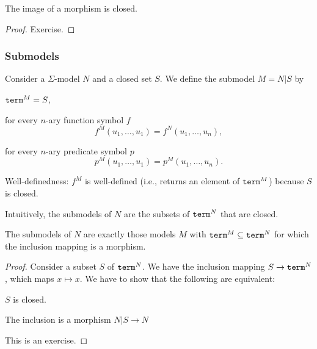 \begin{theorem}
The image of a morphism is closed.
\end{theorem}
\begin{proof}
Exercise.
\end{proof}

\subsubsection{Submodels}

\begin{definition}[Submodel]
Consider a $\Sigma$-model $N$ and a closed set $S$.
We define the submodel $M=N|S$ by
\begin{compactitem}
\item $\mathtt{term}^{M}=S$,
\item for every $n$-ary function symbol $f$
 \[f^{M}(u_1,\ldots,u_1)=f^{N}(u_1,\ldots,u_n),\]
\item for every $n$-ary predicate symbol $p$
 \[p^{M}(u_1,\ldots,u_1)=p^{M}(u_1,\ldots,u_n).\]
\end{compactitem}

Well-definedness: $f^M$ is well-defined (i.e., returns an element of $\mathtt{term}^M$) because $S$ is closed.
\end{definition}

Intuitively, the submodels of $N$ are the subsets of $\mathtt{term}^N$ that are closed.

\begin{theorem}
The submodels of $N$ are exactly those models $M$ with $\mathtt{term}^M\subseteq \mathtt{term}^N$ for which the inclusion mapping is a morphism.
\end{theorem}
\begin{proof}
Consider a subset $S$ of $\mathtt{term}^N$.
We have the inclusion mapping $S\to \mathtt{term}^N$, which maps $x\mapsto x$.
We have to show that the following are equivalent:
\begin{compactenum}
 \item $S$ is closed.
 \item The inclusion is a morphism $N|S\to N$
\end{compactenum}
This is an exercise.
\end{proof}

